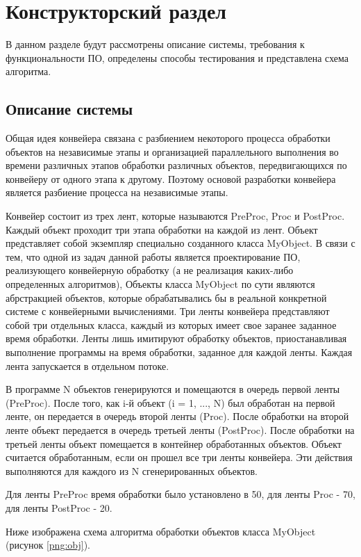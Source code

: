 \chapter{ Конструкторский раздел}
\label{cha:design}
        В данном разделе будут рассмотрены описание системы, требования к функциональности ПО,
        определены способы тестирования и представлена схема алгоритма.
    \section{Описание системы}
Общая идея конвейера связана с разбиением некоторого процесса обработки объектов на независимые этапы и организацией параллельного выполнения во времени различных этапов обработки различных объектов, передвигающихся по конвейеру от одного этапа к другому.
Поэтому основой разработки конвейера является разбиение процесса на независимые этапы.

Конвейер состоит из трех лент, которые называются PreProc, Proc и PostProc. Каждый объект проходит три этапа обработки на каждой из лент. Объект представляет собой экземпляр специально созданного класса MyObject. В связи с тем, что одной из задач данной работы является проектирование ПО, реализующего конвейерную обработку (а не реализация каких-либо определенных алгоритмов), Объекты класса MyObject по сути являются абрстракцией объектов, которые обрабатывались бы в реальной конкретной системе с конвейерными вычислениями. Три ленты конвейера представляют собой три отдельных класса, каждый из которых имеет свое заранее заданное время обработки. Ленты лишь имитируют обработку объектов, приостанавливая выполнение программы на время обработки, заданное для каждой ленты. Каждая лента запускается в отдельном потоке.

В программе N объектов генерируются и помещаются в очередь первой ленты (PreProc). После того, как i-й объект (i = 1, ..., N) был обработан на первой ленте, он передается в очередь второй ленты (Proc). После обработки на второй ленте объект передается в очередь третьей ленты (PostProc). После обработки на третьей ленты объект помещается в контейнер обработанных объектов. Объект считается обработанным, если он прошел все три ленты конвейера. Эти действия выполняются для каждого из N сгенерированных объектов.

Для ленты PreProc время обработки было установлено в 50, для ленты Proc - 70, для ленты PostProc - 20.

Ниже изображена схема алгоритма обработки объектов класса MyObject (рисунок \ref{png:obj}).

